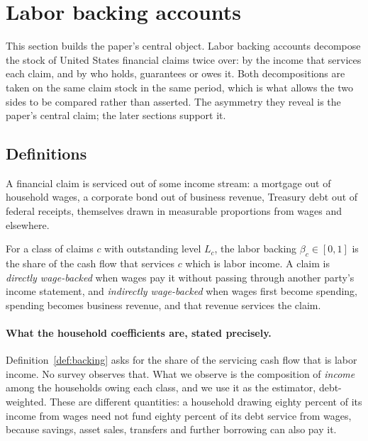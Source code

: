 \section{Labor backing accounts}
\label{sec:accounts}

This section builds the paper's central object. Labor backing accounts decompose the stock of
United States financial claims twice over: by the income that services each claim, and by who
holds, guarantees or owes it. Both decompositions are taken on the same claim stock in the same
period, which is what allows the two sides to be compared rather than asserted. The asymmetry they
reveal is the paper's central claim; the later sections support it.

\subsection{Definitions}

A financial claim is serviced out of some income stream: a mortgage out of household wages, a
corporate bond out of business revenue, Treasury debt out of federal receipts, themselves drawn in
measurable proportions from wages and elsewhere.

\begin{definition}
\label{def:backing}
For a class of claims $c$ with outstanding level $L_c$, the labor backing $\beta_c \in [0,1]$ is
the share of the cash flow that services $c$ which is labor income. A claim is
\emph{directly wage-backed} when wages pay it without passing through another party's income
statement, and \emph{indirectly wage-backed} when wages first become spending, spending becomes
business revenue, and that revenue services the claim.
\end{definition}

\paragraph{What the household coefficients are, stated precisely.} Definition~\ref{def:backing}
asks for the share of the servicing cash flow that is labor income. No survey observes that. What
we observe is the composition of \emph{income} among the households owing each class, and we use
it as the estimator, debt-weighted. These are different quantities: a household drawing eighty
percent of its income from wages need not fund eighty percent of its debt service from wages,
because savings, asset sales, transfers and further borrowing can also pay it.

